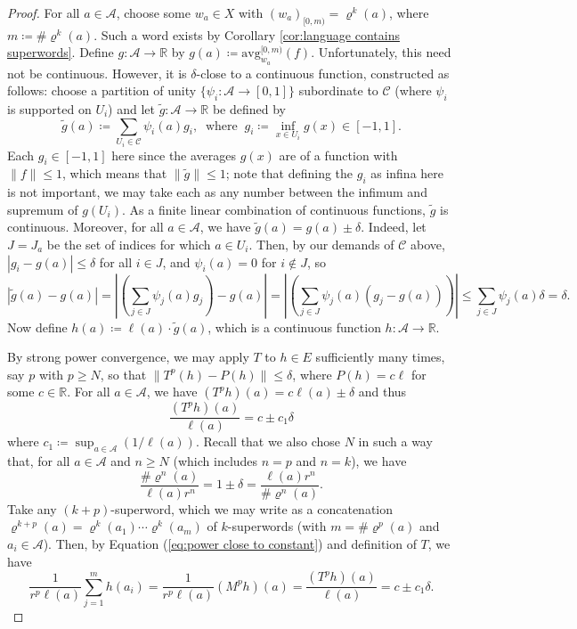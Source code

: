 \documentclass[11pt]{amsart}
\numberwithin{equation}{section}
\theoremstyle{plain}
\theoremstyle{definition}
\newcommand{\R}{{\mathbb R}}
\newcommand{\mc}{\mathcal}
\newcommand{\A}{\mc A}
\newcommand{\sub}{\varrho}
\newcommand{\avg}{\mathrm{avg}}
\begin{document}
\begin{proof}
For all \(a \in \A\), choose some \(w_a \in X\) with \((w_a)_{[0,m)} = \sub^k(a)\), where \(m \coloneqq \# \sub^k(a)\). Such a word exists by Corollary \ref{cor:language contains superwords}. Define \(g \colon \A \to \R\) by \(g(a) \coloneqq \avg_{w_a}^{[0,m)}(f)\). Unfortunately, this need not be continuous. However, it is \(\delta\)-close to a continuous function, constructed as follows: choose a partition of unity \(\{\psi_i \colon \A \to [0,1]\}\) subordinate to \(\mathscr{C}\) (where \(\psi_i\) is supported on \(U_i\)) and let \(\widetilde{g} \colon \A \to \R\) be defined by
\[
\widetilde{g}(a) \coloneqq \sum_{U_i \in \mathscr{C}} \psi_i(a) g_i  , \ \text{ where } \ g_i \coloneqq \inf_{x \in U_i} g(x) \in [-1,1] .
\]
Each \(g_i \in [-1,1]\) here since the averages \(g(x)\) are of a function with \(\|f\| \leq 1\), which means that \(\|\widetilde{g}\| \leq 1\); note that defining the \(g_i\) as infina here is not important, we may take each as any number between the infimum and supremum of \(g(U_i)\). As a finite linear combination of continuous functions, \(\widetilde{g}\) is continuous. Moreover, for all \(a \in \A\), we have \(\widetilde{g}(a)= g(a) \pm \delta\). Indeed, let \(J = J_a\) be the set of indices for which \(a \in U_i\). Then, by our demands of \(\mathscr{C}\) above, \(|g_i - g(a)| \leq \delta\) for all \(i \in J\), and \(\psi_i(a) = 0\) for \(i \notin J\), so
\[
|\widetilde{g}(a) - g(a)| = \left| \left(\sum_{j \in J} \psi_j(a) g_j \right) - g(a) \right| = \left| \left(\sum_{j \in J} \psi_j(a) (g_j - g(a)) \right) \right| \leq \sum_{j \in J} \psi_j(a) \delta = \delta .
\]
Now define \(h(a) \coloneqq \ell(a) \cdot \widetilde{g}(a)\), which is a continuous function \(h \colon \A \to \R\).

By strong power convergence, we may apply \(T\) to \(h \in E\) sufficiently many times, say \(p\) with \(p \geq N\), so that \(\|T^p(h) - P(h)\| \leq \delta\), where \(P(h) = c\ell\) for some \(c \in \R\). For all \(a \in \A\), we have \((T^p h)(a) = c\ell(a) \pm \delta\) and thus
\begin{equation}\label{eq:power close to constant}
\frac{(T^p h)(a)}{\ell(a)} = c \pm c_1 \delta
\end{equation}
where \(c_1 \coloneqq \sup_{a \in \A} (1/\ell(a))\). Recall that we also chose \(N\) in such a way that, for all \(a \in \A\) and \(n \geq N\) (which includes \(n = p\) and \(n = k\)), we have
\begin{equation}\label{eq:superword length estimate}
\frac{\# \sub^n(a)}{ \ell(a) r^n} = 1 \pm \delta = \frac{ \ell(a) r^n}{\# \sub^n(a)} .
\end{equation}
Take any \((k+p)\)-superword, which we may write as a concatenation \(\sub^{k+p}(a) = \sub^k(a_1) \cdots \sub^k(a_m)\) of \(k\)-superwords (with \(m = \# \sub^p(a)\) and \(a_i \in \A\)). Then, by Equation (\ref{eq:power close to constant}) and definition of \(T\), we have
\[
\frac{1}{r^p \ell(a)} \sum_{j=1}^m h(a_i) = \frac{1}{r^p \ell(a)}(M^p h)(a) = \frac{(T^p h)(a)}{\ell(a)} = c \pm c_1\delta .
\]


\end{proof}
\end{document}
